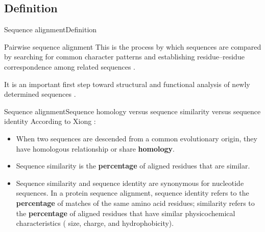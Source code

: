 \documentclass[10pt]{beamer}
\begin{document}
{%
\subsection{Definition}

\begin{frame}{Sequence alignment}{Definition}

\begin{block}{Pairwise sequence alignment}
\centering
This is the process by which
sequences are compared by searching for common character patterns and establishing residue–residue correspondence among related sequences \cite{xiong2006essential}.
\end{block}

\begin{block}{}
\centering
 It is an important
first step toward structural and functional analysis of newly determined sequences \cite{xiong2006essential}.
\end{block}

\end{frame}


\begin{frame}{Sequence alignment}{Sequence homology versus sequence similarity versus sequence identity}
According to Xiong \cite{xiong2006essential}:
\begin{itemize}
    \item When two sequences are descended from a common evolutionary origin, they have 
homologous relationship or share \textbf{homology}.
    \item Sequence similarity is the \textbf{percentage} of aligned residues that are similar.
    \item Sequence similarity and sequence identity are synonymous for nucleotide sequences. In a protein sequence alignment, sequence identity refers to the \textbf{percentage} of matches of the same amino acid residues; similarity refers to the \textbf{percentage} of aligned residues that have similar physicochemical characteristics ( size, charge, and hydrophobicity).


\end{itemize}
\end{frame}}
\end{document}
